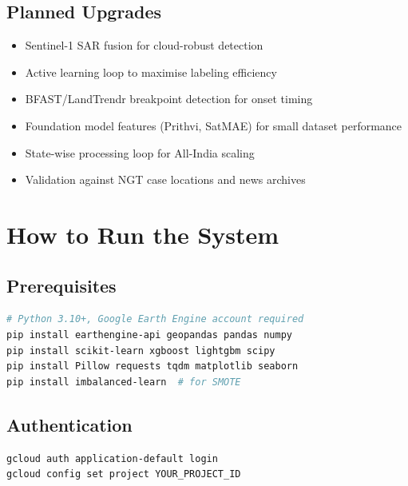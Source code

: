 \documentclass[12pt, a4paper]{article}
\begin{document}
\subsection{Planned Upgrades}

\begin{itemize}[noitemsep]
  \item Sentinel-1 SAR fusion for cloud-robust detection
  \item Active learning loop to maximise labeling efficiency
  \item BFAST/LandTrendr breakpoint detection for onset timing
  \item Foundation model features (Prithvi, SatMAE) for small
        dataset performance
  \item State-wise processing loop for All-India scaling
  \item Validation against NGT case locations and news archives
\end{itemize}

\section{How to Run the System}

\subsection{Prerequisites}

\begin{lstlisting}[language=bash, caption=Installation]
# Python 3.10+, Google Earth Engine account required
pip install earthengine-api geopandas pandas numpy
pip install scikit-learn xgboost lightgbm scipy
pip install Pillow requests tqdm matplotlib seaborn
pip install imbalanced-learn  # for SMOTE
\end{lstlisting}

\subsection{Authentication}

\begin{lstlisting}[language=bash, caption=Google Earth Engine authentication]
gcloud auth application-default login
gcloud config set project YOUR_PROJECT_ID
\end{lstlisting}
\end{document}
